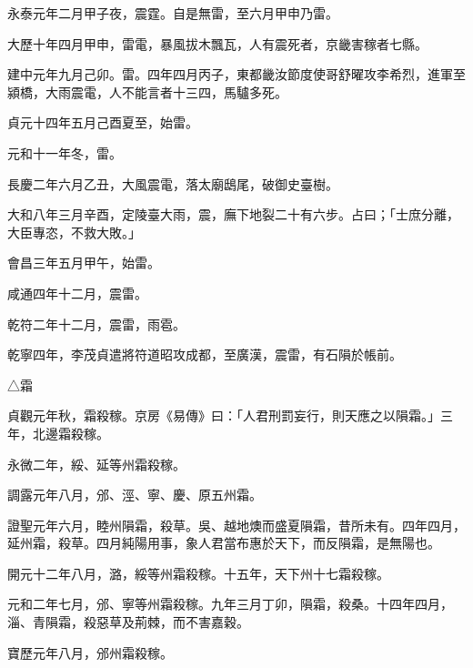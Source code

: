 \begin{pinyinscope}
 永泰元年二月甲子夜，震霆。自是無雷，至六月甲申乃雷。



 大歷十年四月甲申，雷電，暴風拔木飄瓦，人有震死者，京畿害稼者七縣。



 建中元年九月己卯。雷。四年四月丙子，東都畿汝節度使哥舒曜攻李希烈，進軍至潁橋，大雨震電，人不能言者十三四，馬驢多死。



 貞元十四年五月己酉夏至，始雷。



 元和十一年冬，雷。



 長慶二年六月乙丑，大風震電，落太廟鴟尾，破御史臺樹。



 大和八年三月辛酉，定陵臺大雨，震，廡下地裂二十有六步。占曰；「士庶分離，大臣專恣，不救大敗。」



 會昌三年五月甲午，始雷。



 咸通四年十二月，震雷。



 乾符二年十二月，震雷，雨雹。



 乾寧四年，李茂貞遣將符道昭攻成都，至廣漢，震雷，有石隕於帳前。



 △霜



 貞觀元年秋，霜殺稼。京房《易傳》曰：「人君刑罰妄行，則天應之以隕霜。」三年，北邊霜殺稼。



 永微二年，綏、延等州霜殺稼。



 調露元年八月，邠、涇、寧、慶、原五州霜。



 證聖元年六月，睦州隕霜，殺草。吳、越地燠而盛夏隕霜，昔所未有。四年四月，延州霜，殺草。四月純陽用事，象人君當布惠於天下，而反隕霜，是無陽也。



 開元十二年八月，潞，綏等州霜殺稼。十五年，天下州十七霜殺稼。



 元和二年七月，邠、寧等州霜殺稼。九年三月丁卯，隕霜，殺桑。十四年四月，淄、青隕霜，殺惡草及荊棘，而不害嘉穀。



 寶歷元年八月，邠州霜殺稼。




\end{pinyinscope}
